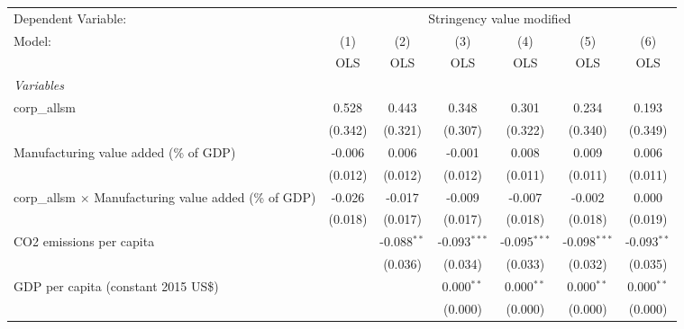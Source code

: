 
\begingroup
\centering
\begin{tabular}{lcccccc}
   \toprule
   Dependent Variable: & \multicolumn{6}{c}{Stringency value modified}\\
   Model:                                                        & (1)     & (2)           & (3)            & (4)            & (5)            & (6)\\  
                                                                 &  OLS    & OLS           & OLS            & OLS            & OLS            & OLS\\  
   \midrule
   \emph{Variables}\\
   corp\_allsm                                                   & 0.528   & 0.443         & 0.348          & 0.301          & 0.234          & 0.193\\   
                                                                 & (0.342) & (0.321)       & (0.307)        & (0.322)        & (0.340)        & (0.349)\\   
   Manufacturing value added (\% of GDP)                         & -0.006  & 0.006         & -0.001         & 0.008          & 0.009          & 0.006\\   
                                                                 & (0.012) & (0.012)       & (0.012)        & (0.011)        & (0.011)        & (0.011)\\   
   corp\_allsm $\times$ Manufacturing value added (\% of GDP)    & -0.026  & -0.017        & -0.009         & -0.007         & -0.002         & 0.000\\   
                                                                 & (0.018) & (0.017)       & (0.017)        & (0.018)        & (0.018)        & (0.019)\\   
   CO2 emissions per capita                                      &         & -0.088$^{**}$ & -0.093$^{***}$ & -0.095$^{***}$ & -0.098$^{***}$ & -0.093$^{**}$\\   
                                                                 &         & (0.036)       & (0.034)        & (0.033)        & (0.032)        & (0.035)\\   
   GDP per capita (constant 2015 US\$)                           &         &               & 0.000$^{**}$   & 0.000$^{**}$   & 0.000$^{**}$   & 0.000$^{**}$\\   
                                                                 &         &               & (0.000)        & (0.000)        & (0.000)        & (0.000)\\   

\end{tabular}
